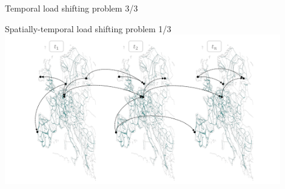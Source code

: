 \begin{frame}{Temporal load shifting problem 3/3}
{  }
\end{frame}


\begin{frame}{Spatially-temporal load shifting problem 1/3}
  \centering
  \vspace{0.3cm}
  \hspace{-0.3cm}\includegraphics[width=12cm]{images/spatial-temporal-vlinks.png}
\end{frame}


